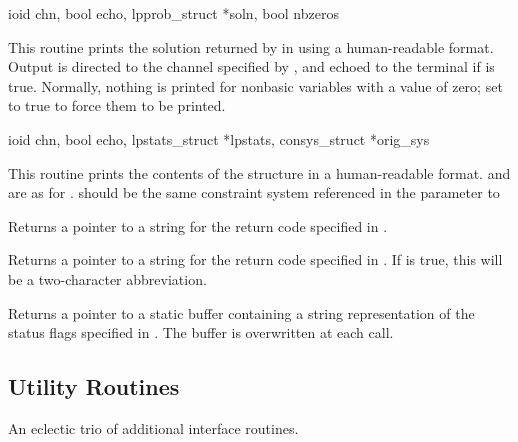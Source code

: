 \begin{subrdoc}
  \item
	  {ioid chn, bool echo, lpprob_struct *soln,  bool nbzeros}

  This routine prints the solution returned by  in 
  using a human-readable format.
  Output is directed to the channel specified by , and echoed to the
  terminal if  is true.
  Normally, nothing is printed for nonbasic variables with a value of zero;
  set  to true to force them to be printed.

  \item
	  {ioid chn, bool echo, lpstats_struct *lpstats,
	   consys_struct *orig_sys}

  This routine prints the contents of the  structure in a
  human-readable format.
   and  are as for .
   should be the same constraint system referenced in the
   parameter to 

  \item

  Returns a pointer to a string for the return code
  specified in .

  \item

  Returns a pointer to a string for the return code
  specified in .
  If  is true, this will be a two-character abbreviation.

  \item

  Returns a pointer to a static buffer containing a string representation
  of the status flags specified in .
  The buffer is overwritten at each call.
\end{subrdoc}

\subsection{Utility Routines}
\label{UtilityRoutines}

An eclectic trio of additional interface routines.

